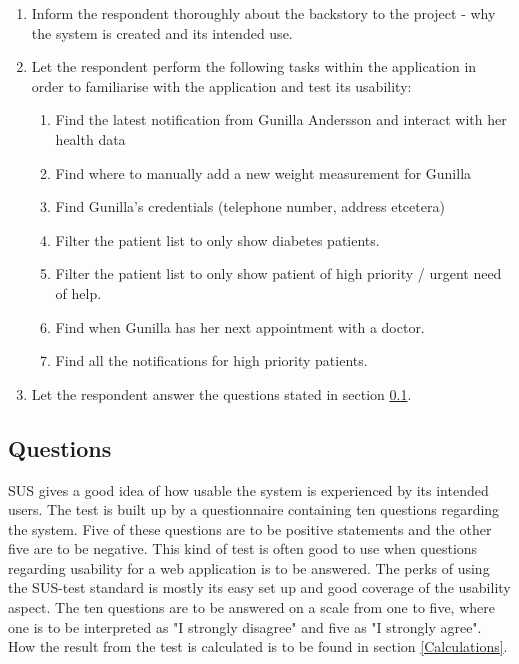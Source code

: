 \documentclass{article}
\begin{document}
	\begin{enumerate}
		\item Inform the respondent thoroughly about the backstory to the project - why the system is created and its intended use. 
		\item Let the respondent perform the following tasks within the application in order to familiarise with the application and test its usability:
		\begin{enumerate}
			\item Find the latest notification from Gunilla Andersson and interact with her health data
			\item Find where to manually add a new weight measurement for Gunilla
			\item Find Gunilla's credentials (telephone number, address etcetera)
			\item Filter the patient list to only show diabetes patients.
			\item Filter the patient list to only show patient of high priority / urgent need of help.
			\item Find when Gunilla has her next appointment with a doctor.
			\item Find all the notifications for high priority patients.
		\end{enumerate}
		\item Let the respondent answer the questions stated in section \ref{Questions}.
	\end{enumerate}
	
	\subsection{Questions} \label{Questions}
	SUS gives a good idea of how usable the system is experienced by its intended users. The test is built up by a questionnaire containing ten questions regarding the system. Five of these questions are to be positive statements and the other five are to be negative. This kind of test is often good to use when questions regarding usability for a web application is to be answered. The perks of using the SUS-test standard is mostly its easy set up and good coverage of the usability aspect. The ten questions are to be answered on a scale from one to five, where one is to be interpreted as "I strongly disagree" and five as "I strongly agree". How the result from the test is calculated is to be found in section \ref{Calculations}. 
	
\end{document}
